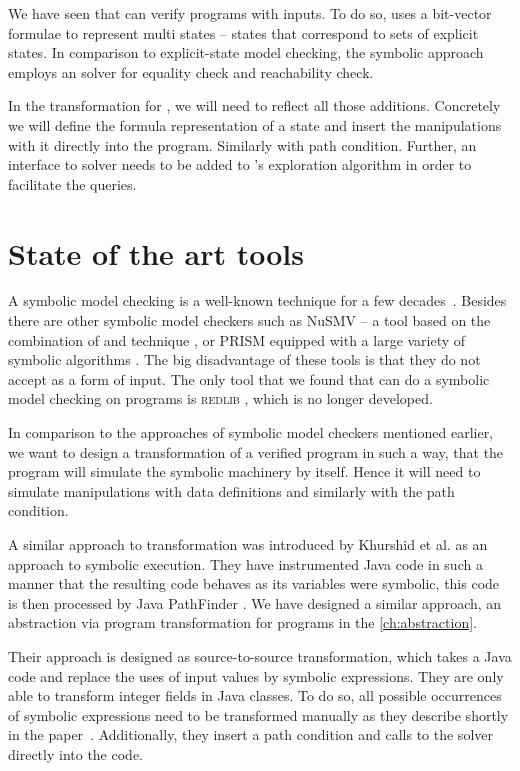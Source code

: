 \begin{summary}
We have seen that \SymDIVINE can verify programs with inputs. To
do so, \SymDIVINE uses a bit-vector formulae to represent multi states --
states that correspond to sets of explicit states. In comparison to
explicit-state model checking, the symbolic approach employs an \SMT solver for
equality check and reachability check.

In the transformation for \DIVINE, we will need to reflect all those additions.
Concretely we will define the formula representation of a state and insert
the manipulations with it directly into the program. Similarly with path
condition. Further, an interface to \SMT solver needs to be added to
\DIVINE's exploration algorithm in order to facilitate the \SMT queries.
\end{summary}

\section{State of the art tools}

A symbolic model checking is a well-known technique for a few
decades~\cite{McMillan93}. Besides \SymDIVINE there are other symbolic
model checkers such as NuSMV -- a tool based on the combination of \SMT and \BDD
technique \cite{Cimatti20}, or PRISM equipped with a large variety of symbolic
algorithms \cite{Kwiatkowska20}. The big disadvantage of these tools is that
they do not accept \Cpp{} as a form of input. The only tool that we found that
can do a symbolic model checking on \Cpp{} programs is \textsc{redlib}
\cite{redlib}, which is no longer developed.

In comparison to the approaches of symbolic model checkers mentioned earlier, we
want to design a transformation of a verified program in such a way, that the
program will simulate the symbolic machinery by itself. Hence it will need to
simulate manipulations with data definitions and similarly with the path
condition.

A similar approach to transformation was introduced by Khurshid et al.
\cite{Khurshid03} as an approach to symbolic execution. They have instrumented
Java code in such a manner that the resulting code behaves as its variables were
symbolic, this code is then processed by Java PathFinder \cite{Havelund20}. We
have designed a similar approach, an abstraction via program transformation for
\LLVM programs in the \autoref{ch:abstraction}.

Their approach is designed as source-to-source transformation, which takes a
Java code and replace the uses of input values by symbolic expressions. They are
only able to transform integer fields in Java classes. To do so, all possible
occurrences of symbolic expressions need to be transformed manually as they
describe shortly in the paper~\cite{Khurshid03}. Additionally, they insert a
path condition and calls to the solver directly into the code.

